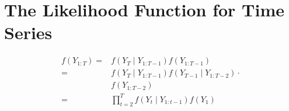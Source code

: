 \section{The Likelihood Function for Time Series}

\begin{align*}
    f\left(Y_{1: T}\right) =&f\left(Y_T \mid Y_{1: T-1}\right) f\left(Y_{1: T-1}\right) \\
    =&f\left(Y_T \mid Y_{1: T-1}\right) f\left(Y_{T-1} \mid Y_{1: T-2}\right) \cdot \\
    &f\left(Y_{1: T-2}\right) \\
    =&\prod_{t=2}^T f\left(Y_t \mid Y_{1: t-1}\right) f\left(Y_1\right)
\end{align*}

